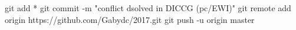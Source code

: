 git add *
git commit -m "conflict dsolved in  DICCG (pc/EWI)"
git remote add origin https://github.com/Gabydc/2017.git
git push -u origin master
